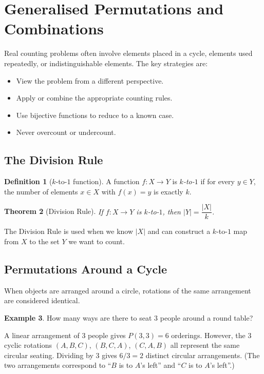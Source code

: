 \documentclass[11pt, a4paper, notitlepage]{report}
\newtheorem{theorem}{Theorem}[section]
\theoremstyle{definition}
\newtheorem{definition}[theorem]{Definition}
\newtheorem{example}[theorem]{Example}
\theoremstyle{remark}
\begin{document}
\section{Generalised Permutations and Combinations}
\label{sec:genpermcomb}

Real counting problems often involve elements placed in a cycle, elements used repeatedly, or
indistinguishable elements.  The key strategies are:
\begin{itemize}
  \item View the problem from a different perspective.
  \item Apply or combine the appropriate counting rules.
  \item Use bijective functions to reduce to a known case.
  \item Never overcount or undercount.
\end{itemize}

\subsection{The Division Rule}
\label{subsec:divisionrule}

\begin{definition}[$k$-to-$1$ function]
A function $f: X \to Y$ is \emph{$k$-to-$1$} if for every $y \in Y$, the number of
elements $x \in X$ with $f(x) = y$ is exactly $k$.
\end{definition}

\begin{theorem}[Division Rule]
\label{thm:division}
If $f : X \to Y$ is $k$-to-$1$, then $|Y| = \dfrac{|X|}{k}$.
\end{theorem}

The Division Rule is used when we know $|X|$ and can construct a $k$-to-$1$ map from $X$ to
the set $Y$ we want to count.

\subsection{Permutations Around a Cycle}
\label{subsec:cycleperm}

When objects are arranged around a circle, rotations of the same arrangement are considered
identical.

\begin{example}
How many ways are there to seat $3$ people around a round table?

A linear arrangement of $3$ people gives $P(3,3) = 6$ orderings.  However, the $3$ cyclic
rotations $(A,B,C)$, $(B,C,A)$, $(C,A,B)$ all represent the same circular seating.  Dividing by
$3$ gives $6/3 = 2$ distinct circular arrangements.  (The two arrangements correspond to
``$B$ is to $A$'s left'' and ``$C$ is to $A$'s left''.)
\end{example}
\end{document}
